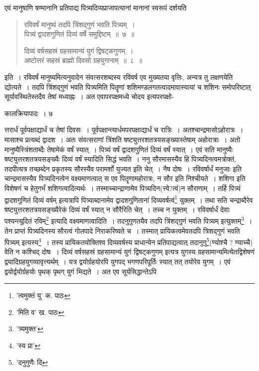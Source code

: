 \documentclass[11pt, openany]{book}
\begin{document}
एवं मानुषाणि षण्मानानि प्रतिपाद्य पित्र्यदिव्यप्राजापत्यानां मानानां स्वरूपं दर्शयति\textendash 

\begin{quote}
 {\ab रविवर्षं मानुष्यं तदपि त्रिंशद्गुणं भवति पित्र्यम्~।\\
पित्र्यं द्वादशगुणितं दिव्यं वर्षे समुद्दिष्टम्~॥~७~॥

दिव्यं वर्षसहस्रं ग्रहसामान्यं युगं द्विषट्कगुणम्~।\\
अष्टोत्तरं सहस्रं ब्राह्मो दिवसो ग्रहयुगानाम्~॥~८~॥}
\end{quote}

इति~। रविवर्षं मानुष्यमित्यनुवादेन संवत्सरशब्दस्य रविवर्ष एव मुख्यतया वृत्तिः, अन्यत्र तु लक्षणयेति द्योत्यते~। तदपि त्रिंशद्गुणं
भवति पित्र्यमिति पितॄणां शशिमण्डलगतत्वादमावास्यायां च शशिनः समोपरिष्टात् सूर्यावस्थितेस्तदैव तेषां मध्याह्नः~। अत एवापरपक्षमध्ये चोदय
इत्यपरपक्षो-
\newpage

\vspace{3cm} \hspace{4cm} कालक्रियापादः~। \hspace{4cm} ७

\vspace{0.3cm}

\noindent त्तरार्धं पूर्वपक्षाद्यार्धं च तेषां दिवसः~। पूर्वपक्षान्त्यार्धमपरपक्षाद्यार्धं च रात्रिः~। अतश्चान्द्रमासोऽहोरात्रः~। मासाश्च प्रत्यब्दं द्वादश~। अतः संवत्सराणां त्रिंशति षष्ट्युत्तरशतत्रयसङ्ख्यास्तेषाम् अहोरात्राः~। अतो मानुष्यैस्त्रिंशताब्दैः तेषामेकं वर्षं स्यात्~। पित्र्यं वर्षं द्वादशगुणितं दिव्यं वर्षं स्यात्~। एवं सति मानुष्यैः षष्ट्युत्तरशतत्रयसङ्ख्यैः दिव्यं वर्षं स्यादिति सिद्धं भवति~। ननु सौरमासस्यैव हि पित्र्यदिनत्वमत्रोक्तं, तदपीत्यत्र तच्छब्देन प्रकृतस्य सौरस्यैव परामर्शो युज्यत इति चेत्~। नैष दोषः~। {\qt रविवर्षार्धं मनुजाः} इति चान्द्रमासस्यैव पित्र्यदिनत्वेन वक्ष्यमाणत्वात् स एव पितॄणामहोरात्रः, न सौर इति निश्चीयते~। शशिगा इति विशेषणं च हेतुगर्भं शशिगत्वादित्यर्थः~। तस्माच्चान्द्राणामेव पित्र्यदिन(त्त्वे?त्वं)न सौराणाम्~। तर्हि {\qt पित्र्यं द्वादशगुणितं दिव्यं वर्षम्} इत्यत्रापि पित्र्याब्दानामेव
द्वादशगुणितानां दिव्यवर्षत्वं\renewcommand{\thefootnote}{१}\footnote{'त्वमुक्तं यु' क. पाठः} युक्तम्~। तथा सति चन्द्राब्दैरेव षष्ट्युत्तरशतत्रयसङ्ख्यैरेकं दिव्यं वर्षं स्यात् न सौरैरिति चेत्~। तच्च न युक्तम्~। {\qt रविवर्षार्धं देवाः पश्यन्त्युदितं रविम्}\renewcommand{\thefootnote}{२}\footnote{'मिति व' ख. पाठः} इत्यादि वक्ष्यमाणत्वादिति~। तदनुगुणतयैव {\qt तदपि त्रिंशद्गुणं भवति पित्र्यम्} इत्युक्तम्\renewcommand{\thefootnote}{३}\footnote{'त्र्यमुक्त'}~। तेन प्राप्तं
पित्र्यदिनस्य सौरत्वं गोलपादे निराकरिष्यते च~। तस्मात् प्रायिकत्वमेव{\qt तदपि त्रिशद्गुणं भवति पित्र्यम्} इत्यस्य\renewcommand{\thefootnote}{४}\footnote{'स्य प्रा'}~। तस्य प्रायिकतयोक्तिश्व दिव्यवर्षस्य
प्राधान्येन प्रतिपाद्यत्वात् तदानुगु\renewcommand{\thefootnote}{५}\footnote{'दनुगुणैः दि}(ण्योश्चै ? ण्याच्चै) वेति न कश्चिद्
दोषः~। {\qt दिव्यं वर्षसहस्रं ग्रहसामान्यं युगं द्विषट्कगुणम्} इत्यत्र युगस्य ग्रहसामान्यमित्येतद्विशेषणं द्व्यादिग्रहयुगव्यावृत्त्यर्थम्~। यत्र द्वयोर्ग्रहयोरपि युगपद् भगणपरिपूर्तिः स्यात् तत् तयोरेव युगम्~। एवं द्वयोर्द्वयोर्ग्रहयोः पृथक् पृथग् युगं भिद्यते~। अत एव सूर्यसिद्धान्तेऽपि\textendash
\end{document}
